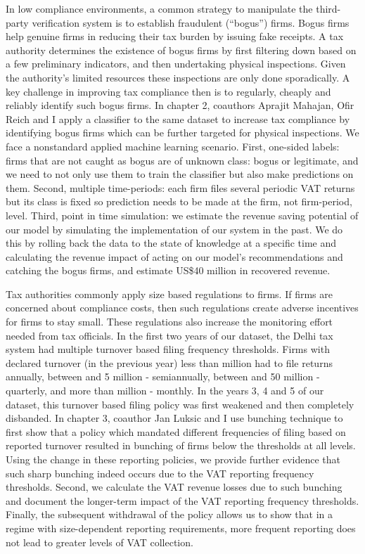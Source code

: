 {In low compliance environments, a common strategy to manipulate the third-party verification system is to establish fraudulent (``bogus'') firms. Bogus firms help genuine firms in reducing their tax burden by issuing fake receipts. A tax authority determines the existence of bogus firms by first filtering down based on a few preliminary indicators, and then undertaking  physical inspections. Given the authority’s limited resources these inspections are only done sporadically. A key challenge in improving tax compliance then is to regularly, cheaply and reliably identify such bogus firms. In chapter 2, coauthors Aprajit Mahajan, Ofir Reich and I apply a classifier to the same dataset to increase tax compliance by identifying bogus firms which can be further targeted for physical inspections. We face a nonstandard applied machine learning scenario. First, one-sided labels: firms that are not caught as bogus are of unknown class: bogus or legitimate, and we need to not only use them to train the classifier but also make predictions on them. Second, multiple time-periods: each firm files several periodic VAT returns but its class is fixed so prediction needs to be made at the firm, not firm-period, level. Third, point in time simulation: we estimate the revenue saving potential of our model by simulating the implementation of our system in the past. We do this by rolling back the data to the state of knowledge at a specific time and calculating the revenue impact of acting on our model’s recommendations and catching the bogus firms, and estimate US\$40 million in recovered revenue.

Tax authorities commonly apply size based regulations to firms. If firms are concerned about compliance costs, then such regulations create adverse incentives for firms to stay small. These regulations also increase the monitoring effort needed from tax officials. 
In the first two years of our dataset, the Delhi tax system had multiple turnover based filing frequency thresholds. Firms with declared turnover (in the previous year) less than  million had to file returns annually, between  and 5 million - semiannually, between  and 50 million - quarterly, and more than  million - monthly. In the years 3, 4 and 5 of our dataset, this turnover based filing policy was first weakened and then completely disbanded. In chapter 3, coauthor Jan Luksic and I use bunching technique to first show that a policy which mandated different frequencies of filing based on reported turnover resulted in bunching of firms below the thresholds at all levels. Using the change in these reporting policies, we provide further evidence that such sharp bunching indeed occurs due to the VAT reporting frequency thresholds. Second, we calculate the VAT revenue losses due to such bunching and document the longer-term impact of the VAT reporting frequency thresholds. Finally, the subsequent withdrawal of the policy allows us to show that in a regime with size-dependent reporting requirements, more frequent reporting does not lead to greater levels of VAT collection.
}

